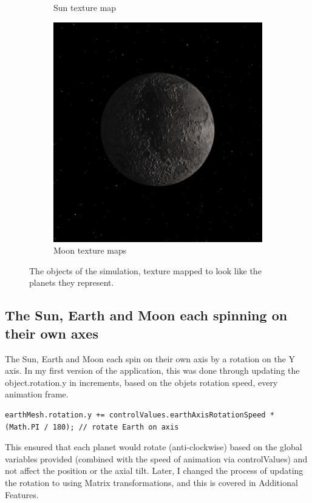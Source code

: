 \documentclass[12pt]{article}
\begin{document}
\begin{figure}[H]
\begin{subfigure}[b]{0.4\textwidth}
                \caption{Sun texture map}
                \label{fig: The Sun texture mapped}
       \end{subfigure}
        \begin{subfigure}[b]{0.4\textwidth}
                \includegraphics[width=\textwidth]{images/moontexture}
                \caption{Moon texture maps}
                \label{fig: The Moon texture mapped}
       \end{subfigure}
       \caption{The objects of the simulation, texture mapped to look like the planets they represent.}\label{fig: Texture mapped Sun, Earth and Moon.}
\end{figure}

\subsection{The Sun, Earth and Moon each spinning on their own axes}
The Sun, Earth and Moon each spin on their own axis by a rotation on the Y axis. In my first version of the application, this was done through updating the object.rotation.y in increments, based on the objets rotation speed, every animation frame.
\begin{lstlisting}
earthMesh.rotation.y += controlValues.earthAxisRotationSpeed * (Math.PI / 180); // rotate Earth on axis
\end{lstlisting}
This ensured that each planet would rotate (anti-clockwise) based on the global variables provided (combined with the speed of animation via controlValues) and not affect the position or the axial tilt. Later, I changed the process of updating the rotation to using Matrix transformations, and this is covered in Additional Features.
\end{document}
